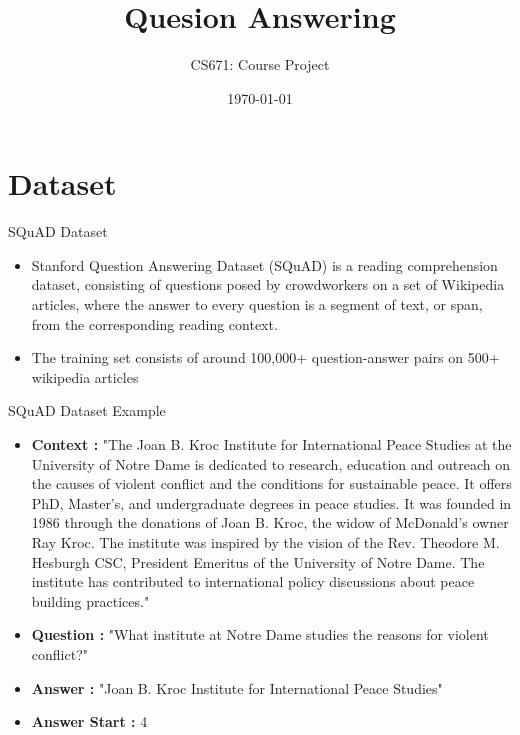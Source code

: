 \documentclass[10pt]{beamer}
\title{Quesion Answering}
\subtitle{CS671: Course Project}
\date{\today}
\author{}
\institute{}
\begin{document}
\maketitle


\section{Dataset}

\begin{frame}[fragile]{SQuAD Dataset}

	\begin{itemize}[<+- | alert@+>]
		\item Stanford Question Answering Dataset (SQuAD) is a reading comprehension dataset, consisting of questions posed by crowdworkers on a set of Wikipedia articles, where the answer to every question is a segment of text, or span, from the corresponding reading context.
		\item  The training set consists of around 100,000+ question-answer pairs on 500+ wikipedia articles
	\end{itemize}
\end{frame}

\begin{frame}[fragile]{SQuAD Dataset Example}

	\begin{itemize}[<+- | alert@+>]
		\item \textbf{Context : } "The Joan B. Kroc Institute for International Peace Studies at the University of Notre Dame is dedicated to research, education and outreach on the causes of violent conflict and the conditions for sustainable peace. It offers PhD, Master's, and undergraduate degrees in peace studies. It was founded in 1986 through the donations of Joan B. Kroc, the widow of McDonald's owner Ray Kroc. The institute was inspired by the vision of the Rev. Theodore M. Hesburgh CSC, President Emeritus of the University of Notre Dame. The institute has contributed to international policy discussions about peace building practices."
		\item  \textbf{Question : } "What institute at Notre Dame studies  the reasons for violent conflict?"
		\item \textbf{Answer : } "Joan B. Kroc Institute for International Peace Studies"
		\item \textbf{Answer Start : } 4
	\end{itemize}
\end{frame}
\end{document}
